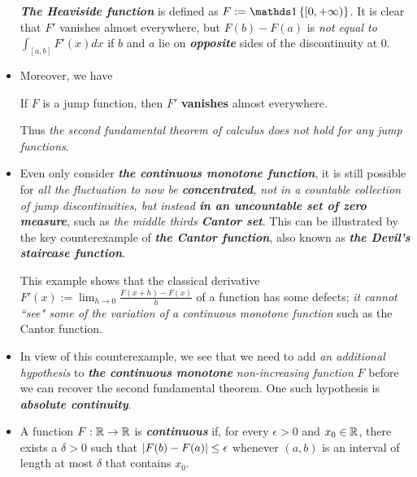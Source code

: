 \documentclass[11pt]{article}
\begin{document}
\begin{itemize}
\begin{example}
\emph{\textbf{The Heaviside function}} is defined as $F := \ind{[0,+\infty)}$. It is clear that $F'$ vanishes almost everywhere, but $F(b) − F(a)$ is
\emph{not equal to} $\int_{[a,b]} F'(x) dx$ if $b$ and $a$ lie on \emph{\textbf{opposite}} sides of the discontinuity at $0$.
\end{example}

\item Moreover, we have
 \begin{proposition}
If $F$ is a jump function, then $F'$ \textbf{vanishes} almost everywhere.
\end{proposition} Thus \emph{the second fundamental theorem of calculus does not hold for any jump functions}.

\item \begin{remark}
Even only consider \emph{\textbf{the continuous monotone function}}, it is still possible for \emph{all the fluctuation to now be \textbf{concentrated}, not in a countable collection of jump discontinuities, but instead \textbf{in an uncountable set of zero measure}}, such as \emph{the middle thirds \textbf{Cantor set}}. This
can be illustrated by the key counterexample of \emph{\textbf{the Cantor function}}, also known as \emph{\textbf{the Devil's staircase function}}.

This example shows that the classical derivative $F'(x) := \lim_{h\rightarrow 0}\frac{F(x+h)−F (x)}{h}$ of a function has some defects; \emph{it
cannot ``see" some of the variation of a continuous monotone function} such as the Cantor function.
\end{remark}

\item \begin{remark}
In view of this counterexample, we see that we need to add \emph{an additional hypothesis} to \emph{\textbf{the continuous monotone} non-increasing function} $F$ before we can recover the second fundamental theorem. One such hypothesis is \emph{\textbf{absolute continuity}}.
\end{remark}


\item \begin{definition}
A function $F : {\mathbb R} \rightarrow {\mathbb R}$ is \emph{\textbf{continuous}} if, for every $\epsilon > 0$ and $x_0 \in {\mathbb R}$, there exists a $\delta > 0$ such that $\left\lvert F(b) - F (a) \right\rvert \le \epsilon$ whenever $(a, b)$ is an interval of length at most $\delta$ that contains $x_0$.
\end{definition}


\end{itemize}
\end{document}
